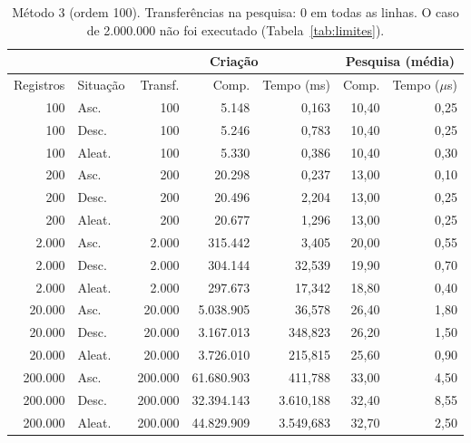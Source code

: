 \documentclass{article}
\begin{document}
\begin{table}[!htb]
    \centering
    \small
    \begin{tabular}{|r|l|r|r|r|r|r|}
        \hline\hline
        & & \multicolumn{3}{c|}{Criação} & \multicolumn{2}{c|}{Pesquisa (média)} \\\hline
        Registros & Situação & Transf. & Comp. & Tempo (ms) & Comp. & Tempo ($\mu$s) \\\hline
        100     & Asc.   & 100     & 5.148      & 0,163     & 10,40 & 0,25 \\
        100     & Desc.  & 100     & 5.246      & 0,783     & 10,40 & 0,25 \\
        100     & Aleat. & 100     & 5.330      & 0,386     & 10,40 & 0,30 \\\hline
        200     & Asc.   & 200     & 20.298     & 0,237     & 13,00 & 0,10 \\
        200     & Desc.  & 200     & 20.496     & 2,204     & 13,00 & 0,25 \\
        200     & Aleat. & 200     & 20.677     & 1,296     & 13,00 & 0,25 \\\hline
        2.000   & Asc.   & 2.000   & 315.442    & 3,405     & 20,00 & 0,55 \\
        2.000   & Desc.  & 2.000   & 304.144    & 32,539    & 19,90 & 0,70 \\
        2.000   & Aleat. & 2.000   & 297.673    & 17,342    & 18,80 & 0,40 \\\hline
        20.000  & Asc.   & 20.000  & 5.038.905  & 36,578    & 26,40 & 1,80 \\
        20.000  & Desc.  & 20.000  & 3.167.013  & 348,823   & 26,20 & 1,50 \\
        20.000  & Aleat. & 20.000  & 3.726.010  & 215,815   & 25,60 & 0,90 \\\hline
        200.000 & Asc.   & 200.000 & 61.680.903 & 411,788   & 33,00 & 4,50 \\
        200.000 & Desc.  & 200.000 & 32.394.143 & 3.610,188 & 32,40 & 8,55 \\
        200.000 & Aleat. & 200.000 & 44.829.909 & 3.549,683 & 32,70 & 2,50 \\\hline\hline
    \end{tabular}
    \caption{\label{tab:m3}Método 3 (ordem 100). Transferências na pesquisa: 0 em todas as linhas. O caso de 2.000.000 não foi executado (Tabela~\ref{tab:limites}).}
\end{table}
\end{document}
